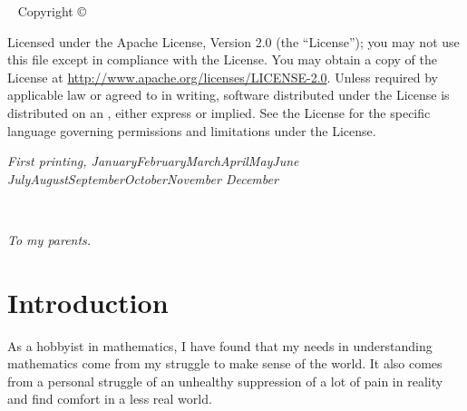 \documentclass{tufte-book}
\newcommand{\monthyear}{%
  \ifcase\month\or January\or February\or March\or April\or May\or June\or
  July\or August\or September\or October\or November\or
  December\fi\space\number\year
}
\begin{document}
\maketitle


\newpage
\begin{fullwidth}
~\vfill
\thispagestyle{empty}
\setlength{\parindent}{0pt}
\setlength{\parskip}{\baselineskip}
Copyright \copyright\ \the\year\ \thanklessauthor

\par{}

\par{}

\par Licensed under the Apache License, Version 2.0 (the ``License''); you may not
use this file except in compliance with the License. You may obtain a copy
of the License at \url{http://www.apache.org/licenses/LICENSE-2.0}. Unless
required by applicable law or agreed to in writing, software distributed
under the License is distributed on an , either express or implied. See the
License for the specific language governing permissions and limitations
under the License.

\par\textit{First printing, \monthyear}
\end{fullwidth}

\tableofcontents

\listoffigures

\listoftables

\cleardoublepage
~\vfill
\begin{doublespace}
\noindent\fontsize{18}{22}\selectfont\itshape
\nohyphenation
To my parents.
\end{doublespace}
\vfill
\vfill


\cleardoublepage
\chapter*{Introduction}

As a hobbyist in mathematics, I have found that my needs in understanding mathematics come from my struggle to make sense of the world. It also comes from a personal struggle of an unhealthy suppression of a lot of pain in reality and find comfort in a less real world.
\end{document}
